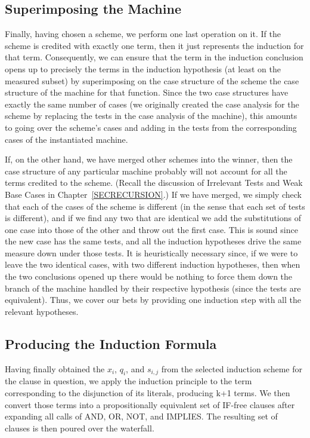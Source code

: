 \documentclass[10pt]{book}
\begin{document}
\subsection{Superimposing the Machine}
Finally, having chosen a scheme, we perform one last operation
on it.  If the scheme is credited with exactly one term, then
it just represents the induction for that term.  Consequently, we
can ensure that the term in the induction conclusion opens up to
precisely the terms in the induction hypothesis (at least
on the measured subset) by superimposing
on the case structure of the scheme the case structure of
the machine for that function.  Since the two case structures have
exactly the same number of cases (we originally created the
case analysis for the scheme by replacing the tests in the
case analysis of the machine), this  amounts to going
over the scheme's cases and adding in the tests from the 
corresponding cases of the instantiated machine.

If, on the other hand, we have merged other schemes into the
winner, then the case structure of any particular machine probably will
not account for all the terms credited to the scheme.  (Recall
the discussion of Irrelevant Tests and Weak Base Cases in Chapter~\ref{SECRECURSION}.)  If we have merged,
we simply check that each of the cases of the scheme is
different (in the sense that each set of tests is different), and if we
find any two that are identical we add the substitutions of one case into those of
the other and throw out the first case.  This is sound since the new case has
the same tests, and all the induction hypotheses drive the same
measure down under those tests.  It is heuristically necessary since,
if we were to leave the two identical cases, with two different induction hypotheses,
then when the two conclusions opened up there would be nothing to force them
down the branch of the machine handled by their respective hypothesis (since the tests
are equivalent).  Thus, we cover our bets by providing one induction step
with all the relevant hypotheses.

\subsection{Producing the Induction Formula}
Having finally obtained the $x_{i}$, $q_{i}$, and $s_{i,j}$ from the
selected induction scheme for the clause in question, we apply the
induction principle to the term corresponding to the disjunction of
its literals, producing k+1 terms.  We then convert those terms
into a propositionally equivalent set of IF-free clauses after expanding all
calls of AND, OR, NOT, and IMPLIES.  The resulting set of clauses is then
poured over the waterfall.
\end{document}
